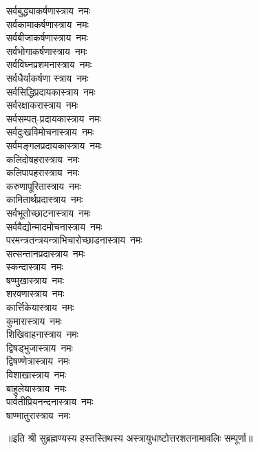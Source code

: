 \begin{flushleft}
\begin{multicols}{2}
सर्वबुद्ध्याकर्षणास्त्राय~नमः\\
सर्वकामाकर्षणास्त्राय~नमः\\
सर्वबीजाकर्षणास्त्राय~नमः\hfill{}\\
सर्वभोगाकर्षणास्त्राय~नमः\\
सर्वविघ्नप्रशमनास्त्राय~नमः\\
सर्वधैर्याकर्षणा स्त्राय~नमः\\
सर्वसिद्धिप्रदायकास्त्राय~नमः\\
सर्वरक्षाकरास्त्राय~नमः\\
सर्वसम्पत्-प्रदायकास्त्राय~नमः\\
सर्वदुःखविमोचनास्त्राय~नमः\\
सर्वमङ्गलप्रदायकास्त्राय~नमः\\
कलिदोषहरास्त्राय~नमः\\
कलिपापहरास्त्राय~नमः\hfill{}\\
करुणापूरितास्त्राय~नमः\\
कामितार्थप्रदास्त्राय~नमः\\
सर्वभूतोच्छाटनास्त्राय~नमः \\
सर्ववैद्योन्मादमोचनास्त्राय~नमः \\
परमन्त्रतन्त्रयन्त्राभिचारो\-च्छाडनास्त्राय~नमः\\
सत्सन्तानप्रदास्त्राय~नमः\\
स्कन्दास्त्राय~नमः\\
षण्मुखास्त्राय~नमः\\
शरवणास्त्राय~नमः\\
कार्त्तिकेयास्त्राय~नमः\hfill{}\\
कुमारास्त्राय~नमः\\
शिखिवाहनास्त्राय~नमः\\
द्विषड्भुजास्त्राय~नमः\\
द्विषण्णेत्रास्त्राय~नमः\\
विशाखास्त्राय~नमः\\
बाहुलेयास्त्राय~नमः\\
पार्वतीप्रियनन्दनास्त्राय~नमः\\
षाण्मातुरास्त्राय~नमः\\
\end{multicols}
\end{flushleft}
॥इति श्री सुब्रह्मण्यस्य हस्तस्तिथस्य अस्त्रायुधाष्टोत्तरशतनामावलिः सम्पूर्णा॥
